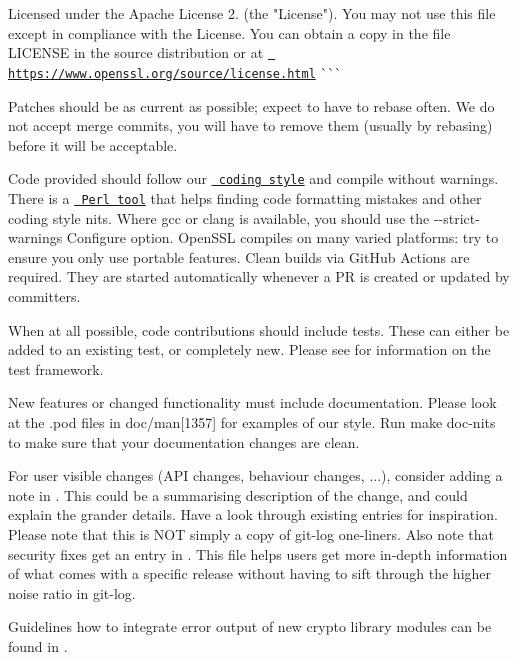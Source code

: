 \begin{DoxyEnumerate}
Licensed under the Apache License 2. (the "{}\+License"{}). You may not use this file except in compliance with the License. You can obtain a copy in the file LICENSE in the source distribution or at \href{https://www.openssl.org/source/license.html}{\texttt{ https\+://www.\+openssl.\+org/source/license.\+html}} \`{}\`{}\`{}
\item Patches should be as current as possible; expect to have to rebase often. We do not accept merge commits, you will have to remove them (usually by rebasing) before it will be acceptable.
\item Code provided should follow our \href{https://www.openssl.org/policies/technical/coding-style.html}{\texttt{ coding style}} and compile without warnings. There is a \href{util/check-format.pl}{\texttt{ Perl tool}} that helps finding code formatting mistakes and other coding style nits. Where {\ttfamily gcc} or {\ttfamily clang} is available, you should use the {\ttfamily -\/-\/strict-\/warnings} {\ttfamily Configure} option. Open\+SSL compiles on many varied platforms\+: try to ensure you only use portable features. Clean builds via Git\+Hub Actions are required. They are started automatically whenever a PR is created or updated by committers.
\item When at all possible, code contributions should include tests. These can either be added to an existing test, or completely new. Please see  for information on the test framework.
\item New features or changed functionality must include documentation. Please look at the {\ttfamily .pod} files in {\ttfamily doc/man\mbox{[}1357\mbox{]}} for examples of our style. Run {\ttfamily make doc-\/nits} to make sure that your documentation changes are clean.
\item For user visible changes (API changes, behaviour changes, ...), consider adding a note in . This could be a summarising description of the change, and could explain the grander details. Have a look through existing entries for inspiration. Please note that this is NOT simply a copy of git-\/log one-\/liners. Also note that security fixes get an entry in . This file helps users get more in-\/depth information of what comes with a specific release without having to sift through the higher noise ratio in git-\/log.
\item Guidelines how to integrate error output of new crypto library modules can be found in . 
\end{DoxyEnumerate}
